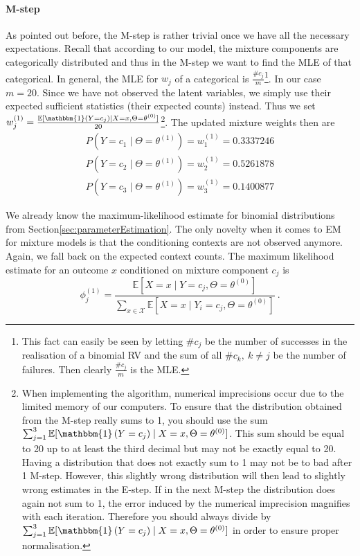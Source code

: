 \documentclass[11pt,leqno,a4paper]{report}\usepackage[]{graphicx}\usepackage[]{color}
\newcommand{\E}{\mathbb{E}}
\newcommand{\id}[1]{\mathbbm{1}\left(#1\right)}
\begin{document}
\paragraph{M-step} As pointed out before, the M-step is rather trivial once we have all the necessary expectations. Recall that according to our model, 
the mixture components are categorically
distributed and thus in the M-step we want to find the MLE of that categorical. In general, the MLE for $ w_{j} $ of a categorical is
$ \frac{\#c_{j}}{m} $\footnote{This fact can easily be seen by letting $ \#c_{j} $ be the number of successes in the realisation of a binomial RV and the sum of all
$ \#c_{k},~k \not = j $ be the number of failures. Then clearly $ \frac{\#c_{j}}{m} $ is the MLE.}. In our case $ m=20 $. Since we have not observed the
latent variables, we simply use their expected sufficient statistics (their expected counts) instead. Thus we set 
$ w_{j}^{(1)} = \frac{\E[\id{Y = c_{j}} \mid X=x,\Theta= \theta^{(0)}]}{20} $\footnote{When implementing the algorithm, numerical imprecisions occur due to the limited
memory of our computers. To ensure that the distribution obtained from the M-step really sums to 1, you should use the sum 
$ \sum_{j=1}^{3} \E[\id{Y = c_{j}} \mid X=x,\Theta= \theta^{(0)}] $. This sum should be equal to 20 up to at least the third decimal but may not be exactly equal to
20. Having a distribution that does not exactly sum to 1 may not be to bad after 1 M-step. However, this slightly wrong distribution will then lead to slightly wrong estimates in the E-step. If in the next M-step the distribution does again not sum to 1, the error induced by the numerical imprecision magnifies with each iteration. Therefore you should always divide by $ \sum_{j=1}^{3} \E[\id{Y = c_{j}} \mid X=x,\Theta= \theta^{(0)}] $ in order to ensure proper normalisation.}. The updated mixture weights then are 
\begin{align}
P(Y=c_{1} \mid \Theta= \theta^{(1)}) = w_{1}^{(1)}= 0.3337246 \\
P(Y=c_{2} \mid \Theta= \theta^{(1)}) = w_{2}^{(1)}= 0.5261878 \nonumber \\
P(Y=c_{3} \mid \Theta= \theta^{(1)}) = w_{3}^{(1)}= 0.1400877 \nonumber
\end{align}

We already know the maximum-likelihood estimate for binomial distributions from 
Section\ref{sec:parameterEstimation}. The only novelty when it comes to EM for mixture models
is that the conditioning contexts are not observed anymore. Again, we fall back on the expected
context counts. The maximum likelihood estimate for an outcome $ x $ conditioned on
mixture component $ c_{j} $ is
\begin{equation}
\phi^{(1)}_{j} = \frac{\E[X=x \mid Y=c_{j},\Theta=\theta^{(0)}]}{\sum_{x \in \mathcal{X}}\E[X=x \mid Y_{i}=c_{j},\Theta=\theta^{(0)}]}\ .
\end{equation}
\end{document}
